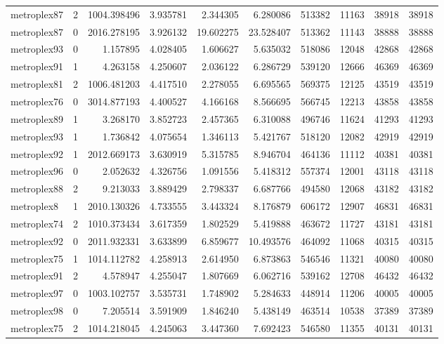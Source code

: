 \documentclass[../../../thesis.tex]{subfiles}
\begin{document}
\begin{longtable}{|l|r|r|r|r|r|r|r|r|r|}
metroplex87 & 2 & 1004.398496 & 3.935781 & 2.344305 & 6.280086 & 513382 & 11163 & 38918 & 38918 \\
metroplex87 & 0 & 2016.278195 & 3.926132 & 19.602275 & 23.528407 & 513362 & 11143 & 38888 & 38888 \\
metroplex93 & 0 & 1.157895 & 4.028405 & 1.606627 & 5.635032 & 518086 & 12048 & 42868 & 42868 \\
metroplex91 & 1 & 4.263158 & 4.250607 & 2.036122 & 6.286729 & 539120 & 12666 & 46369 & 46369 \\
metroplex81 & 2 & 1006.481203 & 4.417510 & 2.278055 & 6.695565 & 569375 & 12125 & 43519 & 43519 \\
metroplex76 & 0 & 3014.877193 & 4.400527 & 4.166168 & 8.566695 & 566745 & 12213 & 43858 & 43858 \\
metroplex89 & 1 & 3.268170 & 3.852723 & 2.457365 & 6.310088 & 496746 & 11624 & 41293 & 41293 \\
metroplex93 & 1 & 1.736842 & 4.075654 & 1.346113 & 5.421767 & 518120 & 12082 & 42919 & 42919 \\
metroplex92 & 1 & 2012.669173 & 3.630919 & 5.315785 & 8.946704 & 464136 & 11112 & 40381 & 40381 \\
metroplex96 & 0 & 2.052632 & 4.326756 & 1.091556 & 5.418312 & 557374 & 12001 & 43118 & 43118 \\
metroplex88 & 2 & 9.213033 & 3.889429 & 2.798337 & 6.687766 & 494580 & 12068 & 43182 & 43182 \\
metroplex8 & 1 & 2010.130326 & 4.733555 & 3.443324 & 8.176879 & 606172 & 12907 & 46831 & 46831 \\
metroplex74 & 2 & 1010.373434 & 3.617359 & 1.802529 & 5.419888 & 463672 & 11727 & 43181 & 43181 \\
metroplex92 & 0 & 2011.932331 & 3.633899 & 6.859677 & 10.493576 & 464092 & 11068 & 40315 & 40315 \\
metroplex75 & 1 & 1014.112782 & 4.258913 & 2.614950 & 6.873863 & 546546 & 11321 & 40080 & 40080 \\
metroplex91 & 2 & 4.578947 & 4.255047 & 1.807669 & 6.062716 & 539162 & 12708 & 46432 & 46432 \\
metroplex97 & 0 & 1003.102757 & 3.535731 & 1.748902 & 5.284633 & 448914 & 11206 & 40005 & 40005 \\
metroplex98 & 0 & 7.205514 & 3.591909 & 1.846240 & 5.438149 & 463514 & 10538 & 37389 & 37389 \\
metroplex75 & 2 & 1014.218045 & 4.245063 & 3.447360 & 7.692423 & 546580 & 11355 & 40131 & 40131 \\

\end{longtable}
\end{document}
